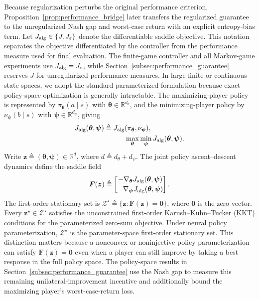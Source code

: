 \documentclass{article}
\theoremstyle{remark}
\newcommand{\R}{\mathbb{R}}
\newcommand{\bz}{\boldsymbol{z}}
\newcommand{\btheta}{\boldsymbol{\theta}}
\newcommand{\bpsi}{\boldsymbol{\psi}}
\newcommand{\bzero}{\boldsymbol{0}}
\newcommand{\bF}{\boldsymbol{F}}
\begin{document}
Because regularization perturbs the original performance criterion, Proposition~\ref{prop:performance_bridge} later transfers the regularized guarantee to the unregularized Nash gap and worst-case return with an explicit entropy-bias term.
Let $J_{\rm alg}\in\{J,J_\varepsilon\}$ denote the differentiable saddle objective.
This notation separates the objective differentiated by the controller from the performance measure used for final evaluation.
The finite-game controller and all Markov-game experiments use $J_{\rm alg}=J_\varepsilon$, while Section~\ref{subsec:performance_guarantee} reserves $J$ for unregularized performance measures.
In large finite or continuous state spaces, we adopt the standard parameterized formulation because exact policy-space optimization is generally intractable.
The maximizing-player policy is represented by $\pi_{\btheta}(a\mid s)$ with $\btheta\in\R^{d_{\theta}}$, and the minimizing-player policy by $\nu_{\bpsi}(b\mid s)$ with $\bpsi\in\R^{d_{\psi}}$, giving
\[
\begin{aligned}
J_{\rm alg}(\btheta,\bpsi)
&\triangleq
J_{\rm alg}(\pi_{\btheta},\nu_{\bpsi}),\\
&\hspace{3em}
\max_{\btheta}\min_{\bpsi}J_{\rm alg}(\btheta,\bpsi).
\end{aligned}
\]
Write $\bz\triangleq(\btheta,\bpsi)\in\R^d$, where $d\triangleq d_\theta+d_\psi$.
The joint policy ascent--descent dynamics define the saddle field
\begin{equation}\label{eq:Fdef}
\bF(\bz)
\triangleq
\begin{bmatrix}
-\nabla_{\btheta}J_{\rm alg}(\btheta,\bpsi)\\[0.2em]
\phantom{-}\nabla_{\bpsi}J_{\rm alg}(\btheta,\bpsi)
\end{bmatrix}.
\end{equation}
The first-order stationary set is $\mathcal Z^{\star}\triangleq\{\bz:\bF(\bz)=\bzero\}$, where $\bzero$ is the zero vector.
Every $\bz^\star\in\mathcal Z^\star$ satisfies the unconstrained first-order Karush--Kuhn--Tucker (KKT) conditions for the parameterized zero-sum objective.
Under neural policy parameterization, $\mathcal Z^\star$ is the parameter-space first-order stationary set.
This distinction matters because a nonconvex or noninjective policy parameterization can satisfy $\bF(\bz)=\bzero$ even when a player can still improve by taking a best response in the full policy space.
The policy-space results in Section~\ref{subsec:performance_guarantee} use the Nash gap to measure this remaining unilateral-improvement incentive and additionally bound the maximizing player's worst-case-return loss.
\end{document}

